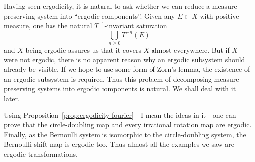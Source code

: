 \documentclass[11pt,a4paper]{article}
\begin{document}
\begin{remark}
Having seen ergodicity, it is natural to ask whether we can reduce a
measure-preserving system into ``ergodic components''. Given any $E\subset X$
with positive measure, one has the natural $T^{-1}$-invariant saturation
\[
  \bigcup_{n\geq0}T^{-n}(E)
\]
and $X$ being ergodic assures us that it covers $X$ almost everywhere. But if
$X$ were not ergodic, there is no apparent reason why an ergodic subsystem
should already be visible. If we hope to use some form of Zorn's lemma, the
existence of an ergodic subsystem is required. Thus this problem of
decomposing measure-preserving systems into ergodic components is natural. We
shall deal with it later.
\end{remark}

\begin{remark}
Using Proposition~\ref{prop:ergodicity-fourier}---I mean the ideas in it---one
can prove that the circle-doubling map and every irrational rotation map are
ergodic. Finally, as the Bernoulli system is isomorphic to the circle-doubling
system, the Bernoulli shift map is ergodic too. Thus almost all the examples
we saw are ergodic transformations.
\end{remark}


\end{document}
